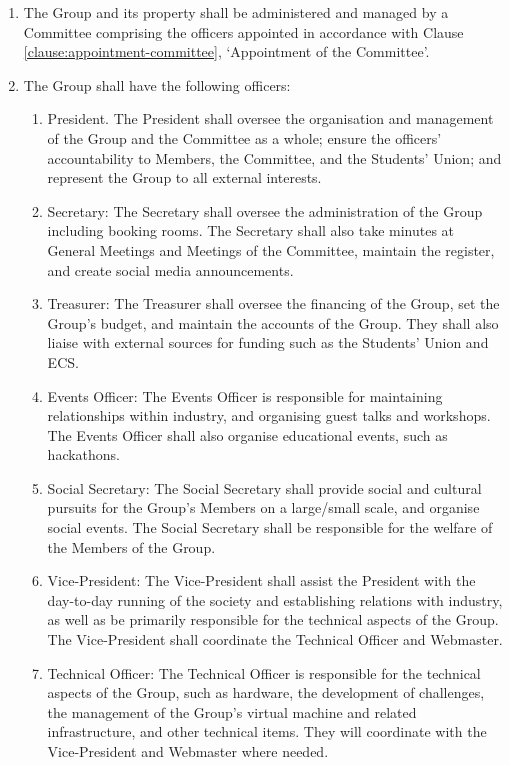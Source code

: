 \documentclass[12pt]{constitution}
\begin{document}
\begin{enumerate}
    \item The Group and its property shall be administered and managed by a Committee comprising the officers appointed in accordance with Clause \ref{clause:appointment-committee}, `Appointment of the Committee'.
    \item The Group shall have the following officers:
    \begin{enumerate}
        \item President. The President shall oversee the organisation and management of the Group and the Committee as a whole; ensure the officers’ accountability to Members, the Committee, and the Students’ Union; and represent the Group to all external interests.
        \item Secretary: The Secretary shall oversee the administration of the Group including booking rooms. The Secretary shall also take minutes at General Meetings and Meetings of the Committee, maintain the register, and create social media announcements.
        \item Treasurer: The Treasurer shall oversee the financing of the Group, set the Group’s budget, and maintain the accounts of the Group. They shall also liaise with external sources for funding such as the Students’ Union and ECS.
        \item Events Officer: The Events Officer is responsible for maintaining relationships within industry, and organising guest talks and workshops. The Events Officer shall also organise educational events, such as hackathons.
        \item Social Secretary: The Social Secretary shall provide social and cultural pursuits for the Group’s Members on a large/small scale, and organise social events. The Social Secretary shall be responsible for the welfare of the Members of the Group.
        \item Vice-President: The Vice-President shall assist the President with the day-to-day running of the society and establishing relations with industry, as well as be primarily responsible for the technical aspects of the Group. The Vice-President shall coordinate the Technical Officer and Webmaster.
        \item Technical Officer: The Technical Officer is responsible for the technical aspects of the Group, such as hardware, the development of challenges, the management of the Group's virtual machine and related infrastructure, and other technical items. They will coordinate with the Vice-President and Webmaster where needed.

\end{enumerate}
\end{enumerate}
\end{document}
